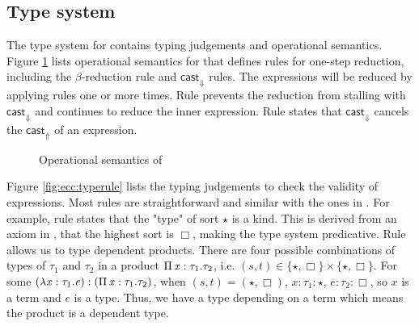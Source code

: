 \subsection{Type system}\label{sec:ecc:type}
The type system for \expcc contains typing judgements and operational semantics. Figure \ref{fig:ecc:dynsem} lists operational semantics for \expcc that defines rules for one-step reduction, including the $\beta$-reduction rule and $ \mathsf{cast}_{\Downarrow} $ rules. The expressions will be reduced by applying rules one or more times. Rule  prevents the reduction from stalling with $ \mathsf{cast}_{\Downarrow} $ and continues to reduce the inner expression. Rule  states that $ \mathsf{cast}_{\Downarrow} $ cancels the $ \mathsf{cast}_{\Uparrow} $ of an expression.

\begin{figure}[ht]
	\ottdefnstep{}
	\caption{Operational semantics of \expcc}
	\label{fig:ecc:dynsem}
\end{figure}

\renewcommand{\ottpremise}[1]{\enskip #1 \enskip}

Figure \ref{fig:ecc:typerule} lists the typing judgements to check the validity of expressions. Most rules are straightforward and similar with the ones in \cc. For example, rule  states that the "type" of sort $ \star $ is a kind. This is derived from an axiom in \cc, that the highest sort is $ \Box $, making the type system predicative. Rule  allows us to type dependent products. There are four possible combinations of types of $\tau_{{\mathrm{1}}}$ and $\tau_{{\mathrm{2}}}$ in a product $\Pi \, \mathit{x}  :  \tau_{{\mathrm{1}}}  .  \tau_{{\mathrm{2}}}$, i.e. $(s,t) \in \{ \star ,  \Box \} \times \{ \star ,  \Box \}$. For some $(\lambda  \mathit{x}  :  \tau_{{\mathrm{1}}}  .  \mathit{e}):(\Pi \, \mathit{x}  :  \tau_{{\mathrm{1}}}  .  \tau_{{\mathrm{2}}})$, when $(s,t)=( \star , \Box )$, $x:\tau_{{\mathrm{1}}}: \star $, $e:\tau_{{\mathrm{2}}}: \Box $, so $x$ is a term and $e$ is a type. Thus, we have a type depending on a term which means the product is a dependent type.

